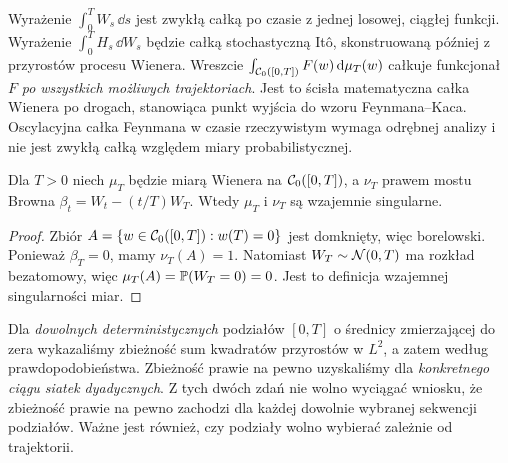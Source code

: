 \begin{uwaga}
Wyrażenie $\int_0^T W_s\,\dd s$ jest zwykłą całką
po czasie z jednej losowej, ciągłej funkcji.
Wyrażenie $\int_0^T H_s\,\dd W_s$ będzie całką
stochastyczną Itô, skonstruowaną później z przyrostów
procesu Wienera. Wreszcie
$\int_{\mathcal{C}_0([0,T])}F(w)\,\mathrm{d}\mu_T(w)$
całkuje funkcjonał $F$ \emph{po wszystkich możliwych
trajektoriach}. Jest to ścisła matematyczna całka Wienera
po drogach, stanowiąca punkt wyjścia do wzoru
Feynmana--Kaca. Oscylacyjna całka Feynmana w czasie
rzeczywistym wymaga odrębnej analizy i nie jest
zwykłą całką względem miary probabilistycznej.
\end{uwaga}


\begin{stwierdzenie}
Dla $T>0$ niech $\mu_T$ będzie miarą Wienera na
$\mathcal{C}_0([0,T])$, a $\nu_T$ prawem mostu Browna
$\beta_t=W_t-(t/T)W_T$. Wtedy $\mu_T$ i $\nu_T$
są wzajemnie singularne.
\end{stwierdzenie}
\begin{proof}
Zbiór $A=\{w\in\mathcal{C}_0([0,T]):w(T)=0\}$ jest domknięty,
więc borelowski. Ponieważ $\beta_T=0$, mamy $\nu_T(A)=1$.
Natomiast $W_T\sim\mathcal{N}(0,T)$ ma rozkład bezatomowy,
więc $\mu_T(A)=\mathbb{P}(W_T=0)=0$. Jest to definicja
wzajemnej singularności miar.
\end{proof}

\begin{uwaga}
Dla \emph{dowolnych deterministycznych} podziałów
$[0,T]$ o średnicy zmierzającej do zera wykazaliśmy
zbieżność sum kwadratów przyrostów w $L^2$, a zatem
według prawdopodobieństwa. Zbieżność prawie na pewno
uzyskaliśmy dla \emph{konkretnego ciągu siatek dyadycznych}.
Z tych dwóch zdań nie wolno wyciągać wniosku, że
zbieżność prawie na pewno zachodzi dla każdej dowolnie
wybranej sekwencji podziałów. Ważne jest również,
czy podziały wolno wybierać zależnie od trajektorii.
\end{uwaga}

